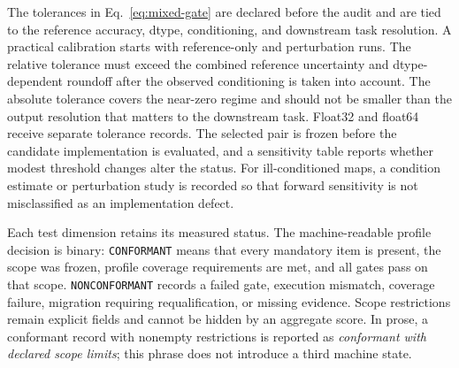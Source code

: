 \documentclass[preprint,12pt]{elsarticle}
\begin{document}
The tolerances in Eq.~\eqref{eq:mixed-gate} are declared before the audit and are tied to the reference accuracy, dtype, conditioning, and downstream task resolution. A practical calibration starts with reference-only and perturbation runs. The relative tolerance must exceed the combined reference uncertainty and dtype-dependent roundoff after the observed conditioning is taken into account. The absolute tolerance covers the near-zero regime and should not be smaller than the output resolution that matters to the downstream task. Float32 and float64 receive separate tolerance records. The selected pair is frozen before the candidate implementation is evaluated, and a sensitivity table reports whether modest threshold changes alter the status. For ill-conditioned maps, a condition estimate or perturbation study is recorded so that forward sensitivity is not misclassified as an implementation defect.

Each test dimension retains its measured status. The machine-readable profile decision is binary: \texttt{CONFORMANT} means that every mandatory item is present, the scope was frozen, profile coverage requirements are met, and all gates pass on that scope. \texttt{NONCONFORMANT} records a failed gate, execution mismatch, coverage failure, migration requiring requalification, or missing evidence. Scope restrictions remain explicit fields and cannot be hidden by an aggregate score. In prose, a conformant record with nonempty restrictions is reported as \emph{conformant with declared scope limits}; this phrase does not introduce a third machine state.
\end{document}
